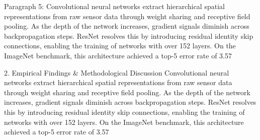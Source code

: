 Paragraph 5: Convolutional neural networks extract hierarchical spatial representations from raw sensor data through weight sharing and receptive field pooling. As the depth of the network increases, gradient signals diminish across backpropagation steps. ResNet resolves this by introducing residual identity skip connections, enabling the training of networks with over 152 layers. On the ImageNet benchmark, this architecture achieved a top-5 error rate of 3.57%


2. Empirical Findings & Methodological Discussion
Convolutional neural networks extract hierarchical spatial representations from raw sensor data through weight sharing and receptive field pooling. As the depth of the network increases, gradient signals diminish across backpropagation steps. ResNet resolves this by introducing residual identity skip connections, enabling the training of networks with over 152 layers. On the ImageNet benchmark, this architecture achieved a top-5 error rate of 3.57%